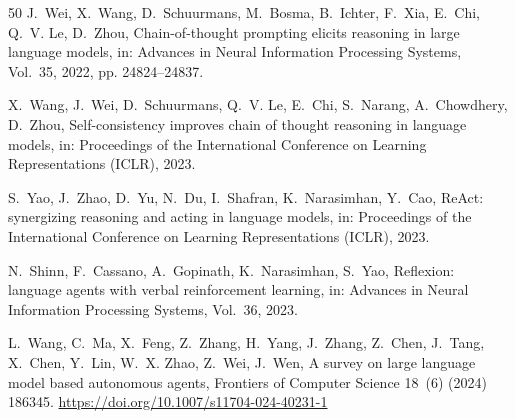 \documentclass[preprint,11pt]{elsarticle}
\begin{document}
\begin{thebibliography}{50}
J.~Wei, X.~Wang, D.~Schuurmans, M.~Bosma, B.~Ichter, F.~Xia, E.~Chi,
Q.~V. Le, D.~Zhou, Chain-of-thought prompting elicits reasoning in
large language models, in: Advances in Neural Information Processing
Systems, Vol.~35, 2022, pp. 24824--24837.

X.~Wang, J.~Wei, D.~Schuurmans, Q.~V. Le, E.~Chi, S.~Narang,
A.~Chowdhery, D.~Zhou, Self-consistency improves chain of thought
reasoning in language models, in: Proceedings of the International
Conference on Learning Representations (ICLR), 2023.

S.~Yao, J.~Zhao, D.~Yu, N.~Du, I.~Shafran, K.~Narasimhan, Y.~Cao,
ReAct: synergizing reasoning and acting in language models, in:
Proceedings of the International Conference on Learning Representations
(ICLR), 2023.

N.~Shinn, F.~Cassano, A.~Gopinath, K.~Narasimhan, S.~Yao, Reflexion:
language agents with verbal reinforcement learning, in: Advances in
Neural Information Processing Systems, Vol.~36, 2023.

L.~Wang, C.~Ma, X.~Feng, Z.~Zhang, H.~Yang, J.~Zhang, Z.~Chen, J.~Tang,
X.~Chen, Y.~Lin, W.~X. Zhao, Z.~Wei, J.~Wen, A survey on large language
model based autonomous agents, Frontiers of Computer Science 18~(6)
(2024) 186345.
\url{https://doi.org/10.1007/s11704-024-40231-1}

\end{thebibliography}
\end{document}

